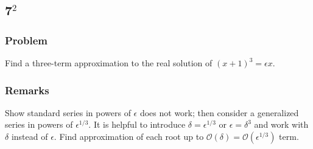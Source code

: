 \documentclass[12pt,twoside]{article}
\begin{document}
\newpage
\subsection{7$^2$}
\subsubsection*{Problem}
Find a three-term approximation to the real solution of ${(x+1)}^3=\epsilon x$.

\subsubsection*{Remarks}
Show standard series in powers of $\epsilon$ does not work; then consider a
generalized series in powers of $\epsilon^{1/3}$. It is helpful to introduce
$\delta=\epsilon^{1/3}$ or $\epsilon=\delta^3$ and work with $\delta$ instead of
$\epsilon$. Find approximation of each root up to
$\mathcal{O}(\delta)=\mathcal{O}(\epsilon^{1/3})$ term.
\end{document}
